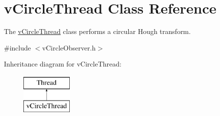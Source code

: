 \hypertarget{classvCircleThread}{}\section{v\+Circle\+Thread Class Reference}
\label{classvCircleThread}


The \hyperlink{classvCircleThread}{v\+Circle\+Thread} class performs a circular Hough transform.  




{\ttfamily \#include $<$v\+Circle\+Observer.\+h$>$}

Inheritance diagram for v\+Circle\+Thread\+:\begin{figure}[H]
\begin{center}
\leavevmode
\includegraphics[height=2.000000cm]{classvCircleThread}
\end{center}
\end{figure}
